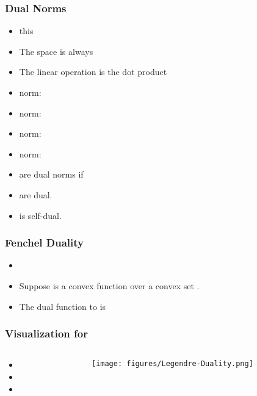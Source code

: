 \documentclass{beamer}
\begin{document}
\begin{frame}
\frametitle{Dual Norms}
\begin{itemize}
  \item this
  \item The space is always 
  \item The linear operation is the dot product \R{$\vu \cdot \vv$}
\item {} norm: 
\item {} norm: 
\item {} norm: 
\item {} norm: 
\item {} are dual norms if 
\item {} are dual.
\item {} is self-dual. 
\end{itemize}
\end{frame}

\begin{frame}
\frametitle{Fenchel Duality}
\begin{itemize}
  \item {}
\item Suppose  is a convex function over a convex set .
\item The dual function to  is
\end{itemize}
\end{frame}

\begin{frame}
  \frametitle{Visualization for \R{$\real$}}
  \begin{columns}
    \begin{column}{0.55\textwidth}
        \begin{itemize}
            \item {}
            \item {}
            \item {}
        \end{itemize}
    \end{column}
    \begin{column}{0.43\textwidth}
          \texttt{[image: figures/Legendre-Duality.png]}
    \end{column}
\end{columns}
\end{frame}
\end{document}
